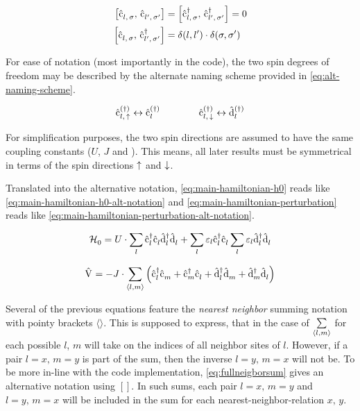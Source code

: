 \begin{equation}
    \label{eq:commutation-relations}
    \begin{split}
        \left[\withspinop[]{l}{\sigma}{},\,\withspinop[]{l'}{\sigma'}{}\right] &= 
        \left[\withspinop[]{l}{\sigma}{\dagger},\,\withspinop[]{l'}{\sigma'}{\dagger}\right] = 0\\
        \left[\withspinop[]{l}{\sigma}{},\,\withspinop[]{l'}{\sigma'}{\dagger}\right] &= \delta(l,l')\cdot\delta(\sigma,\sigma') 
    \end{split}
\end{equation}

For ease of notation (most importantly in the code), the two spin degrees of freedom may be described by the alternate naming scheme provided in \autoref{eq:alt-naming-scheme}.

\begin{equation}
    \label{eq:alt-naming-scheme}
    \withspinop{l}{\up}{(\dagger)} \leftrightarrow \cop{l}{(\dagger)}
    \qquad\qquad
    \withspinop{l}{\down}{(\dagger)} \leftrightarrow \dop{l}{(\dagger)}
\end{equation}

For simplification purposes, the two spin directions are assumed to have the same coupling constants ($U$, $J$ and \epsl).
This means, all later results must be symmetrical in terms of the spin directions $\up$ and $\down$.


Translated into the alternative notation, \autoref{eq:main-hamiltonian-h0} reads like \autoref{eq:main-hamiltonian-h0-alt-notation} and \autoref{eq:main-hamiltonian-perturbation} reads like \autoref{eq:main-hamiltonian-perturbation-alt-notation}.

\begin{equation}
    \label{eq:main-hamiltonian-h0-alt-notation}
    \HzeroHamiltonian = U \cdot \lsum \cop[]{l}{\dagger}\cop[]{l}{} \dop[]{l}{\dagger}\dop[]{l}{} + \lsum\epsl \cop[]{l}{\dagger}\cop[]{l}{} \lsum\epsl \dop[]{l}{\dagger}\dop[]{l}{}
\end{equation}

\begin{equation}
    \label{eq:main-hamiltonian-perturbation-alt-notation}
    \Vhamiltonian =  - J \cdot \neighborsum{l}{m} \left(\cop[]{l}{\dagger}\cop[]{m}{} +\cop[]{m}{\dagger}\cop[]{l}{} + \dop[]{l}{\dagger}\dop[]{m}{} +\dop[]{m}{\dagger}\dop[]{l}{} \right)
\end{equation}

Several of the previous equations feature the \emph{nearest neighbor} summing notation with pointy brackets $\langle\rangle$.
This is supposed to express, that in the case of $\neighborsum[]{l}{m}$ for each possible $l$, $m$ will take on the indices of all neighbor sites of $l$.
However, if a pair $l=x,\,m=y$ is part of the sum, then the inverse $l=y,\,m=x$ will not be.
To be more in-line with the code implementation, \autoref{eq:fullneigborsum} gives an alternative notation using $[]$.
In such sums, each pair $l=x,\,m=y$ and $l=y,\,m=x$ will be included in the sum for each nearest-neighbor-relation $x,\,y$.

